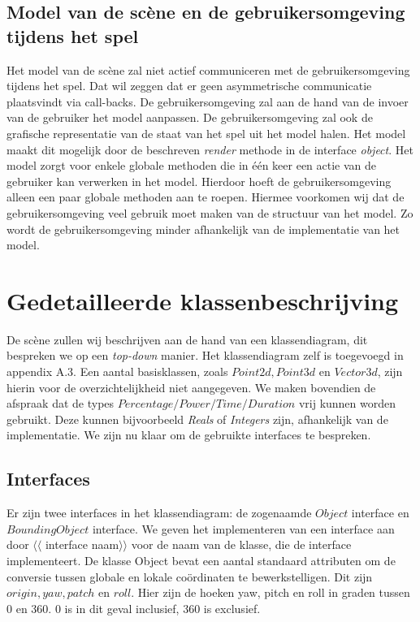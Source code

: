 \documentclass[a4paper,11pt, twoside]{article}
\begin{document}
    \subsection{Model van de sc\`ene en de gebruikersomgeving tijdens het spel}
    Het model van de sc\`ene zal niet actief communiceren met de gebruikersomgeving tijdens het spel. Dat wil zeggen dat er geen asymmetrische communicatie plaatsvindt via call-backs. De gebruikersomgeving zal aan de hand van de invoer van de gebruiker het model aanpassen. De gebruikersomgeving zal ook de grafische representatie van de staat van het spel uit het model halen. Het model maakt dit mogelijk door de beschreven \emph{render} methode in de interface \emph{object}. Het model zorgt voor enkele globale methoden die in \'e\'en keer een actie van de gebruiker kan verwerken in het model. Hierdoor hoeft de gebruikersomgeving alleen een paar globale methoden aan te roepen. Hiermee voorkomen wij dat de gebruikersomgeving veel gebruik moet maken van de structuur van het model. Zo wordt de gebruikersomgeving minder afhankelijk van de implementatie van het model.

    \section{Gedetailleerde klassenbeschrijving}
    De sc\`ene zullen wij beschrijven aan de hand van een klassendiagram, dit bespreken we op een \emph{top-down} manier. Het klassendiagram zelf is toegevoegd in appendix A.3. Een aantal basisklassen, zoals $Point2d, Point3d$ en $Vector3d$, zijn hierin voor de overzichtelijkheid niet aangegeven. We maken bovendien de afspraak dat de types $Percentage/Power/Time/Duration$ vrij kunnen worden gebruikt. Deze kunnen bijvoorbeeld \emph{Reals} of \emph{Integers} zijn, afhankelijk van de implementatie. We zijn nu klaar om de gebruikte interfaces te bespreken.

\subsection{Interfaces}
Er zijn twee interfaces in het klassendiagram: de zogenaamde $Object$ interface en $BoundingObject$ interface. We geven het implementeren van een interface aan door $\langle\langle$ interface naam$\rangle\rangle$ voor de naam van de klasse, die de interface implementeert.  De klasse Object bevat een aantal standaard attributen om de conversie tussen globale en lokale co\"ordinaten te bewerkstelligen. Dit zijn $origin, yaw, patch$ en $roll$. Hier zijn de hoeken yaw, pitch en roll in graden tussen 0 en 360. 0 is in dit geval inclusief, 360 is exclusief.
\end{document}
